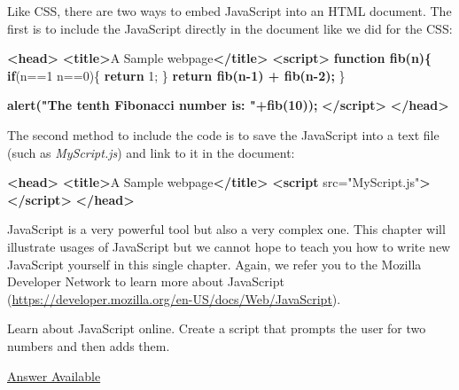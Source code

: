 \documentclass[]{memoir}
\newenvironment{Shaded}{}{}
\newcommand{\KeywordTok}[1]{\textcolor[rgb]{0.00,0.44,0.13}{\textbf{{#1}}}}
\newcommand{\DecValTok}[1]{\textcolor[rgb]{0.25,0.63,0.44}{{#1}}}
\newcommand{\StringTok}[1]{\textcolor[rgb]{0.25,0.44,0.63}{{#1}}}
\newcommand{\OtherTok}[1]{\textcolor[rgb]{0.00,0.44,0.13}{{#1}}}
\newcommand{\ErrorTok}[1]{\textcolor[rgb]{1.00,0.00,0.00}{\textbf{{#1}}}}
\newcommand{\NormalTok}[1]{{#1}}
\begin{document}
Like CSS, there are two ways to embed JavaScript into an HTML document.
The first is to include the JavaScript directly in the document like we
did for the CSS:

\begin{Shaded}
\begin{Highlighting}[]
\KeywordTok{<head>}
    \KeywordTok{<title>}\NormalTok{A Sample webpage}\KeywordTok{</title>}
    \KeywordTok{<script>}
\ErrorTok{        function fib(n)\{}
            \KeywordTok{if}\NormalTok{(n==}\DecValTok{1} \NormalTok{\textbar{}\textbar{} n==}\DecValTok{0}\NormalTok{)\{}
                \KeywordTok{return} \DecValTok{1}\NormalTok{;}
            \NormalTok{\}}
\ErrorTok{            return fib(n-1) + fib(n-2);}
        \NormalTok{\}}

\ErrorTok{        alert("The tenth Fibonacci number is: "+fib(10));}
    \KeywordTok{</script>}
\KeywordTok{</head>}
\end{Highlighting}
\end{Shaded}

The second method to include the code is to save the JavaScript into a
text file (such as \emph{MyScript.js}) and link to it in the document:

\begin{Shaded}
\begin{Highlighting}[]
\KeywordTok{<head>}
    \KeywordTok{<title>}\NormalTok{A Sample webpage}\KeywordTok{</title>}
    \KeywordTok{<script}\OtherTok{ src=}\StringTok{"MyScript.js"}\KeywordTok{></script>}
\KeywordTok{</head>}
\end{Highlighting}
\end{Shaded}

JavaScript is a very powerful tool but also a very complex one. This
chapter will illustrate usages of JavaScript but we cannot hope to teach
you how to write new JavaScript yourself in this single chapter. Again,
we refer you to the Mozilla Developer Network to learn more about
JavaScript
(\url{https://developer.mozilla.org/en-US/docs/Web/JavaScript}).


Learn about JavaScript online. Create a script that prompts the user for
two numbers and then adds them.

\hyperref[Ans-14-6]{Answer Available}
\end{document}
